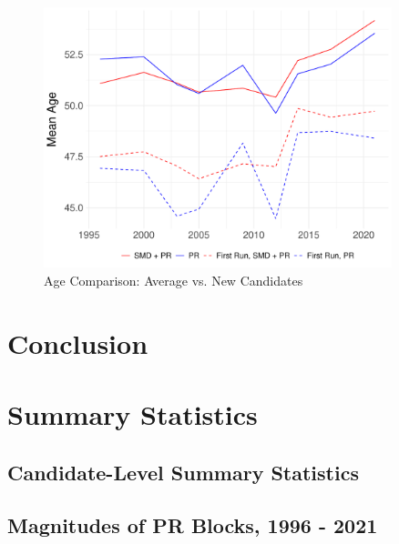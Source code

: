 \documentclass[a4paper, 11pt]{article}
\begin{document}
\begin{figure}[!htbp]
	\includegraphics[width = 0.9\textwidth]{../figure/paper/age_first_run.pdf}
	\caption{Age Comparison: Average vs. New Candidates}
	\label{fig:ageFirstRun}
\end{figure}



\section{Conclusion}


\newpage




\newpage

\appendix

\setcounter{table}{0}
\setcounter{figure}{0}
\renewcommand{\thetable}{A\arabic{table}}
\renewcommand{\thefigure}{A\arabic{figure}}

\section{Summary Statistics}

\subsection{Candidate-Level Summary Statistics}



\newpage

\subsection{Magnitudes of PR Blocks, 1996 - 2021}
\end{document}
